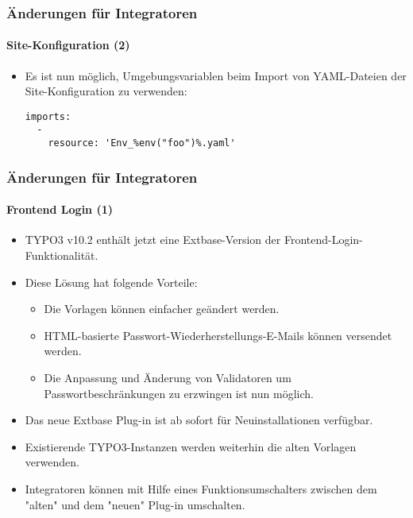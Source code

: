 \begin{frame}[fragile]
	\frametitle{Änderungen für Integratoren}
	\framesubtitle{Site-Konfiguration (2)}

	\lstset{basicstyle=\tiny\ttfamily}

	\begin{itemize}

		\item Es ist nun möglich, Umgebungsvariablen beim Import von YAML-Dateien der Site-Konfiguration zu verwenden:
\begin{lstlisting}
imports:
  -
    resource: 'Env_%env("foo")%.yaml'
\end{lstlisting}

	\end{itemize}

\end{frame}


\begin{frame}[fragile]
	\frametitle{Änderungen für Integratoren}
	\framesubtitle{Frontend Login (1)}
	\begin{itemize}
		\item TYPO3 v10.2 enthält jetzt eine Extbase-Version der Frontend-Login-Funktionalität.
		\item Diese Lösung hat folgende Vorteile:

			\begin{itemize}
				\item Die Vorlagen können einfacher geändert werden.
				\item HTML-basierte Passwort-Wiederherstellungs-E-Mails können versendet werden.
				\item Die Anpassung und Änderung von Validatoren um Passwortbeschränkungen zu erzwingen ist nun möglich.
			\end{itemize}
		\item Das neue Extbase Plug-in ist ab sofort für Neuinstallationen verfügbar.
		\item Existierende TYPO3-Instanzen werden weiterhin die alten Vorlagen verwenden.
		\item Integratoren können mit Hilfe eines Funktionsumschalters zwischen dem "alten" und dem "neuen" Plug-in umschalten. 

	\end{itemize}

\end{frame}

